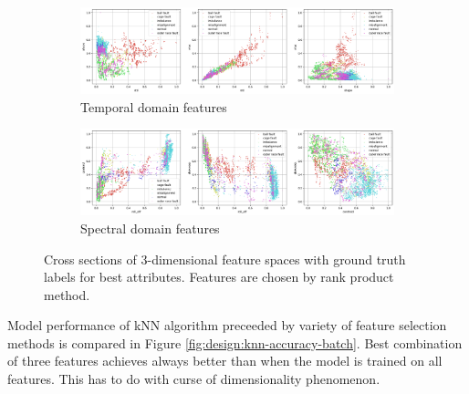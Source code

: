 \begin{figure}[ht]
    \centering
    \begin{subfigure}[b]{\textwidth}
        \includegraphics[width=\textwidth]{assets/design/best-features-scatter-fault-A-temporal.png}
        \caption{Temporal domain features}
    \end{subfigure}
    \hfill
    \begin{subfigure}[b]{\textwidth}
        \includegraphics[width=\textwidth]{assets/design/best-features-scatter-fault-A-spectral.png}
        \caption{Spectral domain features}
    \end{subfigure} 
    \caption{Cross sections of 3-dimensional feature spaces with ground truth labels for best attributes. Features are chosen by rank product method.}
    \label{fig:design:feature-space-scatter}
\end{figure}

Model performance of kNN algorithm preceeded by variety of feature selection methods is compared in Figure \ref{fig:design:knn-accuracy-batch}. Best combination of three features achieves always better than when the model is trained on all features. This has to do with curse of dimensionality phenomenon. 

